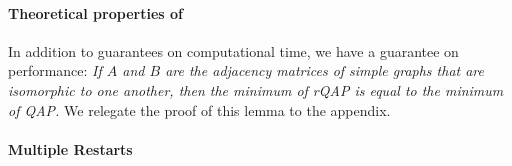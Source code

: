 \documentclass{article} %
\begin{document}
% 

\vspace{-5pt}
\paragraph{Theoretical properties of \FAQ} %
\label{sub:theory}


In addition to guarantees on computational time, we have a guarantee on performance:  
\emph{	If $A$ and $B$ are the adjacency matrices of simple graphs that are isomorphic to one another, then the minimum of rQAP is equal to the minimum of QAP.} We relegate the proof of this lemma to the appendix.







\vspace{-5pt}
\paragraph{Multiple Restarts} %
\label{sub:multiple_restarts}
\end{document}
